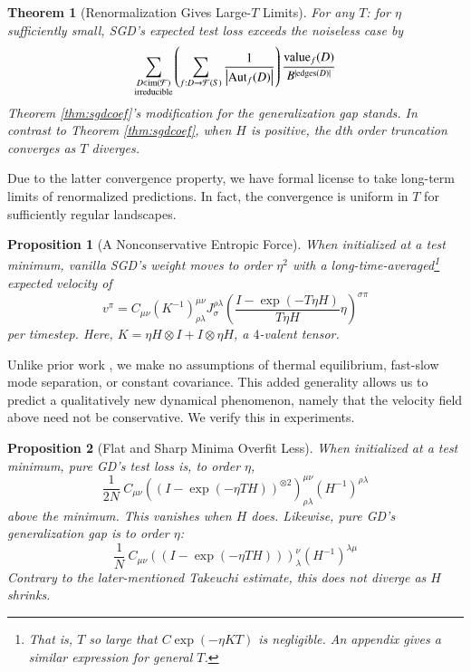 \documentclass{article}
\newtheorem{thm}{Theorem}
\newtheorem{prop}{Proposition}
\newcommand{\Free}{\mathcal{F}}
\newcommand{\Aut}{\text{\textnormal{Aut}}}
\newcommand{\image}{\text{\textnormal{im}}}
\newcommand{\dvalue}{\text{\textnormal{value}}}
\newcommand{\edges}{\text{\textnormal{edges}}}
\newcommand{\wrap}[1]{\left(#1\right)}
\newcommand{\wabs}[1]{\left|#1\right|}
\begin{document}
        \begin{thm}[Renormalization Gives Large-$T$ Limits] \label{thm:renorm}
            For any $T$: for $\eta$ sufficiently small, SGD's expected test
            loss exceeds the noiseless case by 
            \begin{equation} \label{eq:renorm}
                \sum_{\substack{D \in \image(\Free)\\ \text{irreducible}}}
                \wrap{
                    \sum_{f: D\to\Free(S)}
                    \frac{1}{\wabs{\Aut_f(D)}}
                }
                \frac{\dvalue_f(D)}{B^{|\edges(D)|}}
            \end{equation}
            Theorem \ref{thm:sgdcoef}'s modification for the generalization gap
            stands.  In contrast to Theorem \ref{thm:sgdcoef}, when $H$ is
            positive, the $d$th order truncation converges as $T$ diverges.
        \end{thm}
        Due to the latter convergence property, we have formal license to 
        take long-term limits of renormalized predictions.  In fact, the
        convergence is uniform in $T$ for sufficiently regular landscapes.
        \begin{prop}[A Nonconservative Entropic Force]\label{prop:entropic}
            When initialized at a test minimum, vanilla SGD's weight moves to
            order $\eta^2$ with a long-time-averaged\footnote{
                That is, $T$ so large that $C \exp(-\eta K T)$ is negligible.
                An appendix gives a similar expression for general $T$.
            }
            expected velocity of
            $$
                v^\pi = C_{\mu \nu}
                \wrap{K^{-1}}^{\mu\nu}_{\rho\lambda}
                J^{\rho\lambda}_{\sigma}
                \wrap{\frac{I - \exp(-T \eta H)}{T \eta H} \eta}^{\sigma \pi}
            $$
            per timestep.
            Here, $K = \eta H \otimes I + I \otimes \eta H$, a
            $4$-valent tensor. 
        \end{prop}
        Unlike prior work \cite{we19b}, we make no assumptions of
        thermal equilibrium, fast-slow mode separation, or constant covariance.
        This added generality allows us to predict a qualitatively new
        dynamical phenomenon, namely that the velocity field above need not be
        conservative.  We verify this in experiments.
        \begin{prop}[Flat and Sharp Minima Overfit Less]\label{prop:overfit}
            When initialized at a test minimum, pure GD's test loss is, to
            order $\eta$, 
            $$
                \frac{1}{2N} ~
                    C_{\mu\nu}
                    \wrap{(I - \exp(-\eta T H))^{\otimes 2}}^{\mu\nu}_{\rho\lambda}
                    \wrap{H^{-1}}^{\rho\lambda}
            $$
            above the minimum.  This vanishes when $H$ does. 
            Likewise, pure GD's generalization gap is to order $\eta$:  
            $$
                \frac{1}{N} ~
                    C_{\mu\nu}
                    \wrap{(I - \exp(-\eta T H))}^{\nu}_{\lambda}
                    \wrap{H^{-1}}^{\lambda\mu}
            $$
            Contrary to the later-mentioned Takeuchi estimate, this does not
            diverge as $H$ shrinks.
        \end{prop}
\end{document}
